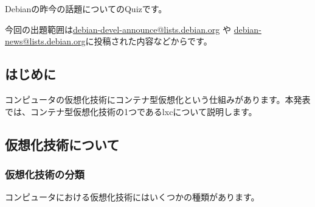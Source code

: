 \documentclass[mingoth,a4paper]{jsarticle}
\begin{document}

Debianの昨今の話題についてのQuizです。

今回の出題範囲は\url{debian-devel-announce@lists.debian.org} や \url{debian-news@lists.debian.org}に投稿された内容などからです。

\begin{multicols}{2}

\end{multicols}





\subsection{はじめに}

コンピュータの仮想化技術にコンテナ型仮想化という仕組みがあります。本発表では、コンテナ型仮想化技術の1つであるlxcについて説明します。

\subsection{仮想化技術について}

\subsubsection{仮想化技術の分類}

コンピュータにおける仮想化技術にはいくつかの種類があります。
\end{document}
